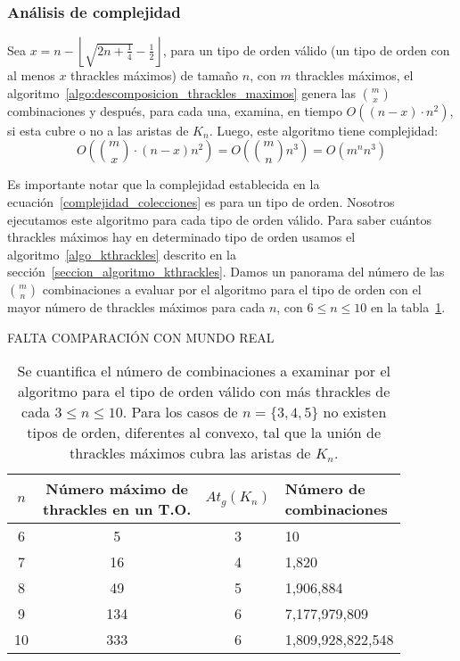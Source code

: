   \subsubsection{Análisis de complejidad}
  Sea $x=n - \left\lfloor\sqrt{2n + \frac{1}{4}} - \frac{1}{2}\right\rfloor$, para un tipo de orden válido (un tipo de orden con al menos $x$ thrackles máximos) de tamaño $n$, con $m$ thrackles máximos, el algoritmo~\ref{algo:descomposicion_thrackles_maximos} genera las
  $\binom{m}{x}$ combinaciones y después, para cada una, examina, en tiempo $O((n - x) \cdot n^2)$, si esta cubre o no a las aristas de $K_n$. Luego, este algoritmo tiene complejidad:
  \begin{equation}\displaystyle
    O\left(\binom{m}{x}\cdot ( n- x ) n^2 \right) = O \left( \binom{m}{n} n^3 \right) = O(m^n n^3)
    \label{complejidad_colecciones}
  \end{equation}

  Es importante notar que la complejidad establecida en la
  ecuación~\ref{complejidad_colecciones} es para un tipo de orden. Nosotros
  ejecutamos este algoritmo para cada tipo de orden válido. Para saber cuántos thrackles
  máximos hay en determinado tipo de orden usamos el algoritmo~\ref{algo_kthrackles} descrito en la sección~\ref{seccion_algoritmo_kthrackles}. Damos un panorama del número de las $\binom{m}{n}$ combinaciones a evaluar por el algoritmo para el tipo de orden con el mayor número de thrackles máximos para cada $n$, con $6\leq n\leq 10$ en la tabla~\ref{tabla:numero_operaciones_thrackles_maximos}.

    {\huge FALTA COMPARACIÓN CON MUNDO REAL}

  \begin{table}[t]
    \centering
    \begin{tabular}{|c|c|c|l|}
      \hline
      $n$ & \makecell{Número máximo de \\ thrackles en un T.O.} &$At_g(K_n)$& \makecell{Número de \\
      combinaciones} \\ \hline
      \hline
      6 & 5 & 3 & 10 \\ \hline
      7 & 16 & 4 & 1,820 \\\hline
      8 & 49 & 5 & 1,906,884 \\\hline
      9 & 134 & 6 & 7,177,979,809 \\\hline
      10 & 333 & 6 & 1,809,928,822,548 \\ \hline
    \end{tabular}
    \caption{Se cuantifica el número de combinaciones a examinar por el algoritmo para el
    tipo de orden válido con más thrackles de cada $ 3 \leq n \leq 10$. Para los casos de
    $n = \{3,4,5\}$ no existen tipos de orden, diferentes al convexo, tal que la unión de
    thrackles máximos cubra las aristas de $K_n$.}
    \label{tabla:numero_operaciones_thrackles_maximos}
  \end{table}

